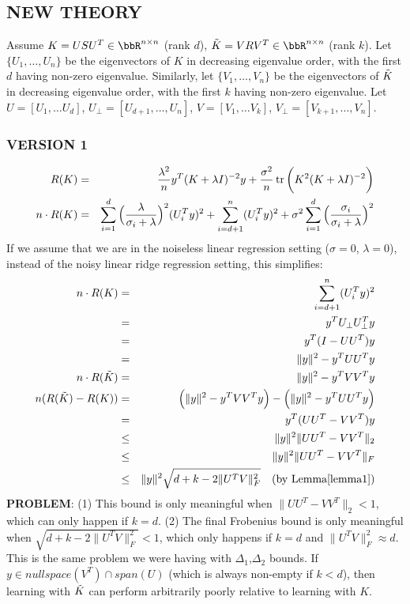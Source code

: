 \subsection{NEW THEORY}
Assume $K = USU^T \in \RR^{n \times n}$ (rank $d$), $\tK = VRV^T\in \RR^{n \times n}$ (rank $k$).
Let $\{U_1,\ldots,U_n\}$ be the eigenvectors of $K$ in decreasing eigenvalue order, with the first $d$ having non-zero eigenvalue.
Similarly, let $\{V_1,\ldots,V_n\}$ be the eigenvectors of $\tK$ in decreasing eigenvalue order, with the first $k$ having non-zero eigenvalue.
Let $U = [U_1,\ldots U_d]$, $U_{\perp} = [U_{d+1},\ldots,U_n]$, $V = [V_1,\ldots V_k]$, $V_{\perp} = [V_{k+1},\ldots,V_n]$.

\subsubsection{VERSION 1}
\begin{eqnarray*}
	R(K) &=& \frac{\lambda^2}{n}y^T (K+\lambda I)^{-2} y + \frac{\sigma^2}{n} \tr\bigg(K^2(K+\lambda I)^{-2}\bigg) \\
	n\cdot R(K) &=& \sum_{i=1}^d \Big(\frac{\lambda}{\sigma_i + \lambda}\Big)^2(U_i^T y)^2 + \sum_{i=d+1}^n (U_i^T y)^2 + \sigma^2 \sum_{i=1}^d \Big(\frac{\sigma_i}{\sigma_i + \lambda}\Big)^2 \\
\end{eqnarray*}
If we assume that we are in the noiseless linear regression setting ($\sigma=0$, $\lambda=0$), instead of the noisy linear ridge regression setting, this simplifies:
\begin{eqnarray*}
	n\cdot R(K) &=& \sum_{i=d+1}^n (U_i^T y)^2 \\
	&=& y^T U_{\perp} U_{\perp}^T y \\
	&=& y^T (I - UU^T) y \\
	&=& \|y\|^2 - y^T UU^T y \\
	n\cdot R(\tK) &=& \|y\|^2 - y^T VV^T y \\
	n(R(\tK) - R(K)) &=& \Big(\|y\|^2 - y^T VV^T y\Big) - \Big(\|y\|^2 - y^T UU^T y\Big)\\
	&=& y^T (UU^T - VV^T) y \\
	&\leq& \|y\|^2 \|UU^T - VV^T\|_2 \\
	&\leq& \|y\|^2 \|UU^T - VV^T\|_F \\
	&\leq& \|y\|^2 \sqrt{d + k - 2 \|U^T V\|_F^2} \quad \text{(by Lemma\ref{lemma1})}\\
\end{eqnarray*}
\textbf{PROBLEM}: (1) This bound is only meaningful when $\|UU^T - VV^T\|_2 < 1$, which can only happen if $k=d$. (2) The final Frobenius bound is only meaningful when  $\sqrt{d + k - 2 \|U^T V\|_F^2} < 1$, which only happens if $k=d$ and $\|U^T V\|_F^2 \approx d$.
This is the same problem we were having with $\Delta_1$,$\Delta_2$ bounds.
If $y \in nullspace(V^T) \cap span(U)$ (which is always non-empty if $k<d$), then learning with $\tK$ can perform arbitrarily poorly relative to learning with $K$.

